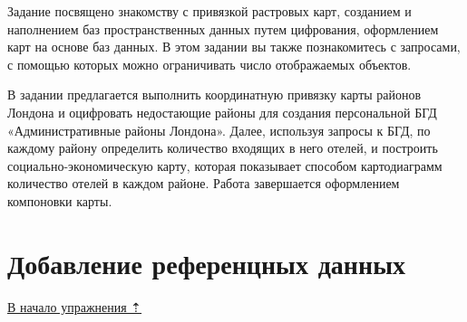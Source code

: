\documentclass[]{book}
\theoremstyle{definition}
\theoremstyle{definition}
\theoremstyle{definition}
\theoremstyle{remark}
\begin{document}
Задание посвящено знакомству с привязкой растровых карт, созданием и
наполнением баз пространственных данных путем цифрования, оформлением
карт на основе баз данных. В этом задании вы также познакомитесь с
запросами, с помощью которых можно ограничивать число отображаемых
объектов.

В задании предлагается выполнить координатную привязку карты районов
Лондона и оцифровать недостающие районы для создания персональной БГД
«Административные районы Лондона». Далее, используя запросы к БГД, по
каждому району определить количество входящих в него отелей, и построить
социально-экономическую карту, которая показывает способом картодиаграмм
количество отелей в каждом районе. Работа завершается оформлением
компоновки карты.

\hypertarget{map-ref-economic-reference}{%
\section{Добавление референцных
данных}\label{map-ref-economic-reference}}

\protect\hyperlink{map-ref-economic}{В начало упражнения ⇡}
\end{document}
